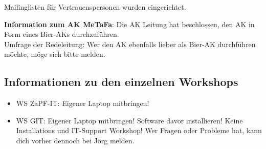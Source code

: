     \begin{info}{}
      Mailinglisten für Vertrauenspersonen wurden eingerichtet.
    \end{info}

    \textbf{Information zum AK MeTaFa}: Die AK Leitung hat beschlossen, den AK in Form eines Bier-AKs durchzuführen. \\
      Umfrage der Redeleitung: Wer den AK ebenfalls lieber als Bier-AK durchführen möchte, möge sich bitte melden.

    \subsection{Informationen zu den einzelnen Workshops}
      \begin{itemize}
        \item WS ZaPF-IT: Eigener Laptop mitbringen!
        \item WS GIT: Eigener Laptop mitbringen! Software davor installieren! Keine Installations und IT-Support Workshop! Wer Fragen oder Probleme hat, kann dich vorher dennoch bei Jörg melden.
      \end{itemize}

